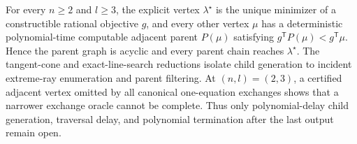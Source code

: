 For every \(n\ge2\) and \(l\ge3\), the explicit vertex \(\lambda^\star\) is the unique minimizer of a constructible rational objective \(g\), and every other vertex \(\mu\) has a deterministic polynomial-time computable adjacent parent \(P(\mu)\) satisfying \(g^{\mathsf T}P(\mu)<g^{\mathsf T}\mu\). Hence the parent graph is acyclic and every parent chain reaches \(\lambda^\star\). The tangent-cone and exact-line-search reductions isolate child generation to incident extreme-ray enumeration and parent filtering. At \((n,l)=(2,3)\), a certified adjacent vertex omitted by all canonical one-equation exchanges shows that a narrower exchange oracle cannot be complete. Thus only polynomial-delay child generation, traversal delay, and polynomial termination after the last output remain open.